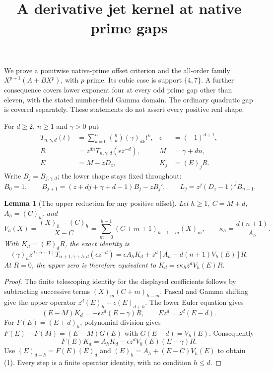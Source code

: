 \documentclass[11pt]{article}
\newtheorem{lemma}{Lemma}
\begin{document}
\setlength{\emergencystretch}{1em}
\title{A derivative jet kernel at native prime gaps}
\author{}\date{}\maketitle
We prove a pointwise native-prime offset criterion and the all-order
family $X^{p+1}(A+BX^p)$, with $p$ prime. Its cubic case is support
$\{4,7\}$. A further consequence covers lower exponent four at every
odd prime gap other than eleven, with the stated number-field Gamma
domain. The ordinary quadratic gap is covered separately.
These statements do not assert every positive real shape.

For $d\ge2$, $n\ge1$ and $\gamma>0$ put
\[
 \begin{aligned}
 T_{n,\gamma,d}(t)&=\sum_{k=0}^n\binom nk(\gamma)_{dk}t^k,
       &\epsilon&=(-1)^{d+1},\\
 R&=z^{dn}T_{n,\gamma,d}(\epsilon z^{-d}),
       &M&=\gamma+dn,\\
 E&=M-zD_z, &K_j&=(E)_jR.
 \end{aligned}
\]
Write $B_j=B_{j,\gamma,d}$; the lower shape stays fixed throughout:
\[
 B_0=1,\qquad B_{j+1}=(z+dj+\gamma+d-1)B_j-zB_j',\qquad
 L_j=z^j(D_z-1)^jB_{n+1}.
\]

\begin{lemma}[The upper reduction for any positive offset]
\label{lem:upper}
Let $h\ge1$, $C=M+d$, $A_h=(C)_h$, and
\[
 V_h(X)=\frac{(X)_h-(C)_h}{X-C}
       =\sum_{m=0}^{h-1}(C+m+1)_{h-1-m}(X)_m,\qquad
 \kappa_h=\frac{d(n+1)}{A_h}.
\]
With $K_d=(E)_dR$, the exact identity is
\[
 (\gamma)_h z^{d(n+1)}T_{n+1,\gamma+h,d}(\epsilon z^{-d})
 =\epsilon A_hK_d+
 z^d[A_h-d(n+1)V_h(E)]R.                         \tag{1}
\]
At $R=0$, the upper zero is therefore equivalent to
$K_d=\epsilon\kappa_h z^dV_h(E)R$.
\end{lemma}
\begin{proof}
The finite telescoping identity for the displayed coefficients follows
by subtracting successive terms
$(X)_m(C+m)_{h-m}$.
Pascal and Gamma shifting give the upper operator
$z^d(E)_h+\epsilon(E)_{d+h}$.
The lower Euler equation gives
\[
 (E-M)K_d=-\epsilon z^d(E-\gamma)R,\qquad
 Ez^d=z^d(E-d).
\]
For $F(E)=(E+d)_h$, polynomial division gives
$F(E)-F(M)=(E-M)G(E)$ with $G(E-d)=V_h(E)$.
Consequently
\[
 F(E)K_d=A_hK_d-\epsilon z^dV_h(E)(E-\gamma)R.
\]
Use $(E)_{d+h}=F(E)(E)_d$ and
$(E)_h=A_h+(E-C)V_h(E)$ to obtain (1).
Every step is a finite operator identity, with no condition $h\le d$.
\end{proof}
\end{document}
